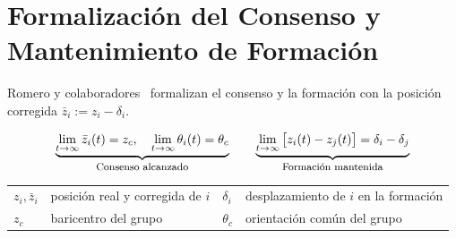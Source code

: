 \section{Formalización del Consenso y Mantenimiento de Formación}

Romero y colaboradores~\cite{romero2024global} formalizan el consenso y la formación con la posición corregida $\bar{z}_i := z_i - \delta_i$.

\begin{equation*}
    \underbrace{\lim_{t\to\infty} \bar{z}_i(t) = z_c, \quad \lim_{t\to\infty} \theta_i(t) = \theta_c}_{\text{\footnotesize Consenso alcanzado}}
    \qquad
    \underbrace{\lim_{t\to\infty} \big[z_i(t) - z_j(t)\big] = \delta_i - \delta_j}_{\text{\footnotesize Formación mantenida}}
\end{equation*}

{\footnotesize
\noindent
\begin{tabular}{l@{\ }l@{\qquad}l@{\ }l}
$z_i,\bar{z}_i$ & posición real y corregida de $i$ & $\delta_i$ & desplazamiento de $i$ en la formación \\
$z_c$ & baricentro del grupo & $\theta_c$ & orientación común del grupo \\
\end{tabular}
}
